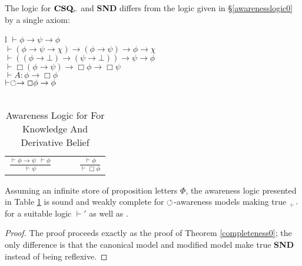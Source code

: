 The logic for  $\textup{\textbf{CSQ}}_\vdash$ and \textbf{SND} differs from the
logic given in \S\ref{awarenesslogic0} by a single axiom:

\begin{table}[h]
\begin{centering}
  \begin{tabular}{l}
    $\vdash \phi \rightarrow \psi \rightarrow \phi$\\
    $\vdash (\phi \rightarrow \psi \rightarrow \chi) \rightarrow (\phi
    \rightarrow \psi) \rightarrow \phi \rightarrow \chi$\\
    $\vdash ((\phi \rightarrow \bot) \rightarrow (\psi \rightarrow \bot))
    \rightarrow \psi \rightarrow \phi$\\
    $\vdash \Box(\phi \rightarrow \psi) \rightarrow \Box \phi \rightarrow \Box
    \psi$\\
    $\vdash A : \phi \rightarrow \Box \phi$\\
    $\vdash \circlearrowleft \to \Box \phi \rightarrow \phi$\\
    \\
    \begin{tabular}{lll}
      $\displaystyle \frac{\vdash \phi \rightarrow \psi \ \  \vdash \phi}{\vdash
      \psi}$ & {\ \ } & $\displaystyle \frac{\vdash \phi}{\vdash \Box \phi}$
    \end{tabular}
  \end{tabular}
  \caption{\label{logic1}Awareness Logic for For Knowledge And
    Derivative Belief}
\end{centering}
\end{table}

\begin{theorem}
  \label{completeness1}Assuming an infinite store of proposition letters
  $\Phi$, the awareness logic presented in Table \ref{logic1} is sound and weakly complete for
  $\circlearrowleft$-awareness models making true $_{\vdash'}$ for a
  suitable logic $\vdash'$ as well as
  .
\end{theorem}
\begin{proof}
The proof proceeds exactly as the proof of Theorem
\ref{completeness0}; the only difference is that the canonical model
and modified model make true \textbf{SND} instead of being reflexive.
\end{proof}

